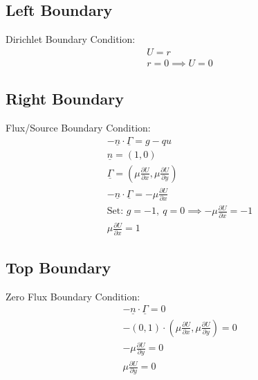 \documentclass[letterpaper,landscape, 10pt]{article}
\renewcommand{\vec}[1]{\underline{#1}}
\newcommand{\pd}[2]{\frac{\partial #1}{\partial #2}}
\begin{document}
	\subsection{Left Boundary}
	Dirichlet Boundary Condition:
	\begin{gather*}
		U = r\\
		r = 0 \implies U = 0
	\end{gather*}
	\subsection{Right Boundary}
	Flux/Source Boundary Condition:
	\begin{gather*}
		-\vec{n}\cdot\vec{\Gamma} = g-qu\\
		\vec{n} = \left(1,0\right)\\
		\vec{\Gamma} = \left(\mu\pd{U}{x},\mu\pd{U}{y}\right)\\
		-\vec{n}\cdot\vec{\Gamma} = -\mu\pd{U}{x}\\
		\text{Set: }g = -1,\ q = 0 \implies -\mu\pd{U}{x} = -1\\
		\mu\pd{U}{x} = 1
	\end{gather*}
	\subsection{Top Boundary}
	Zero Flux Boundary Condition:
	\begin{gather*}
		-\vec{n}\cdot\vec{\Gamma} = 0\\
		-\left(0,1\right)\cdot\left(\mu\pd{U}{x},\mu\pd{U}{y}\right) = 0\\
		-\mu\pd{U}{y} = 0\\
		\mu\pd{U}{y} = 0
	\end{gather*}
	
\end{document}
